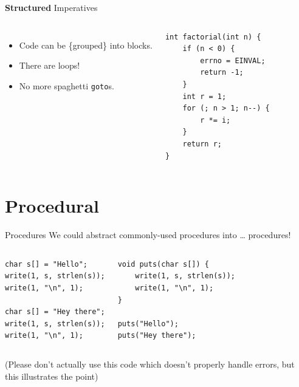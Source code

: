 \documentclass[aspectratio=169]{beamer}
\begin{document}
\begin{frame}[fragile]{\textbf{Structured} Imperatives}
	\begin{columns}
		\begin{itemize}
			\item Code can be \{grouped\} into blocks.
			\item There are loops!
			\item No more spaghetti \texttt{goto}s.
		\end{itemize}
		\small
		\begin{verbatim}
int factorial(int n) {
	if (n < 0) {
		errno = EINVAL;
		return -1;
	}
	int r = 1;
	for (; n > 1; n--) {
		r *= i;
	}
	return r;
}
		\end{verbatim}
	\end{columns}
\end{frame}

\section{Procedural}

\begin{frame}[fragile]{Procedures}
	We could abstract commonly-used procedures into \ldots{} procedures!
	\begin{columns}
		\column{0.5\textwidth}
		\begin{verbatim}
char s[] = "Hello";
write(1, s, strlen(s));
write(1, "\n", 1);

char s[] = "Hey there";
write(1, s, strlen(s));
write(1, "\n", 1);
		\end{verbatim}
		\column{0.5\textwidth}
		\begin{verbatim}
void puts(char s[]) {
	write(1, s, strlen(s));
	write(1, "\n", 1);
}

puts("Hello");
puts("Hey there");
		\end{verbatim}
	\end{columns}
	\medskip
	(Please don't actually use this code which doesn't properly handle errors, but this illustrates the point)
\end{frame}
\end{document}

